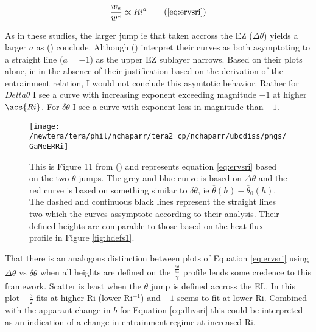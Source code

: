 \begin{equation}
\frac{w_{e}}{w^{*}} \propto Ri^{a} \tag{\ref{eq:ervsri}}
\end{equation}

As in these studies, the larger jump ie that taken accross the \acs{EZ} ($\Delta \theta$) yields a larger $a$ as \citeauthor{FedConzMir04} (\citeyear{FedConzMir04}) conclude.  Although \citeauthor{GarciaMellado} (\citeyear{GarciaMellado}) interpret their curves as both asymptoting to a straight line ($a=-1$) as the upper \acs{EZ} sublayer narrows. Based on their plots alone, ie in the absence of their justification based on the derivation of the entrainment relation, I would not conclude this asymtotic behavior.  Rather for $Delta \theta$ I see a curve with increasing exponent exceeding magnitude $-1$ at higher $\acs{Ri}$.  For $\delta \theta$ I see a curve with exponent less in magnitude than $-1$.\\

\begin{figure}[htbp]
    \centering
    \texttt{[image: /newtera/tera/phil/nchaparr/tera2\_cp/nchaparr/ubcdiss/pngs/GaMeERRi]}
    \caption[Plots of scaled entrainment rate vs Richardson number from \citeauthor{GarciaMellado} (\citeyear{GarciaMellado})]{This is Figure 11 from \citeauthor{GarciaMellado} (\citeyear{GarciaMellado}) and represents equation \ref{eq:ervsri} based on the two $\theta$ jumps.  The grey and blue curve is based on $\Delta \theta$ and the red curve is based on something similar to $\delta \theta$, ie $\overline{\theta}(h) - \overline{\theta}_{0}(h)$. The dashed and continuous black lines represent the straight lines two which the curves assymptote according to their analysis. Their defined heights are comparable to those based on the heat flux profile in Figure \ref{fig:hdefs1}.}
    \label{fig:GarcMelERRi}   %
\end{figure}


That there is an analogous distinction between plots of Equation \ref{eq:ervsri} using $\Delta \theta$ vs $\delta \theta$ when all heights are defined on the $\frac{\frac{\partial \overline{\theta}}{\partial z}}{\gamma}$ profile lends some credence to this framework.  Scatter is least when the $\theta$ jump is defined accross the \acs{EL}.  In this plot $-\frac{3}{2}$ fits at higher \acs{Ri} (lower \acs{Ri}$^{-1}$) and $-1$ seems to fit at lower \acs{Ri}.  Combined with the apparant change in $b$ for Equation \ref{eq:dhvsri} this could be interpreted as an indication of a change in entrainment regime at increased \acs{Ri}.\\ 

